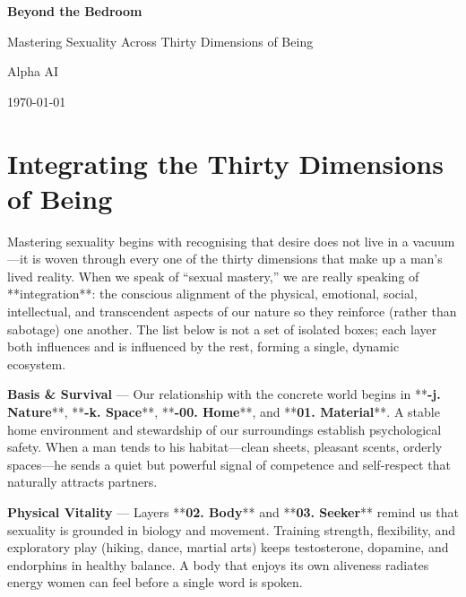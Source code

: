 \documentclass[12pt]{book}
\begin{document}
\begin{titlepage}
    \centering
    {\Huge\bfseries Beyond the Bedroom\par}
    \vspace{1.4cm}
    {\large Mastering Sexuality Across Thirty Dimensions of Being\par}
    \vfill
    {\large Alpha AI\par}
    \vspace{0.5cm}
    {\large \today\par}
\end{titlepage}

\tableofcontents

\section*{Integrating the Thirty Dimensions of Being}

Mastering sexuality begins with recognising that desire does not live in a vacuum—it is woven through every one of the thirty dimensions that make up a man’s lived reality.  When we speak of “sexual mastery,” we are really speaking of **integration**: the conscious alignment of the physical, emotional, social, intellectual, and transcendent aspects of our nature so they reinforce (rather than sabotage) one another.  The list below is not a set of isolated boxes; each layer both influences and is influenced by the rest, forming a single, dynamic ecosystem.

\bigskip
\textbf{Basis \& Survival} — Our relationship with the concrete world begins in **\textbf{-j. Nature}**, **\textbf{-k. Space}**, **\textbf{-00. Home}**, and **\textbf{01. Material}**.  A stable home environment and stewardship of our surroundings establish psychological safety.  When a man tends to his habitat—clean sheets, pleasant scents, orderly spaces—he sends a quiet but powerful signal of competence and self‑respect that naturally attracts partners.

\bigskip
\textbf{Physical Vitality} — Layers **\textbf{02. Body}** and **\textbf{03. Seeker}** remind us that sexuality is grounded in biology and movement.  Training strength, flexibility, and exploratory play (hiking, dance, martial arts) keeps testosterone, dopamine, and endorphins in healthy balance.  A body that enjoys its own aliveness radiates energy women can feel before a single word is spoken.
\end{document}

